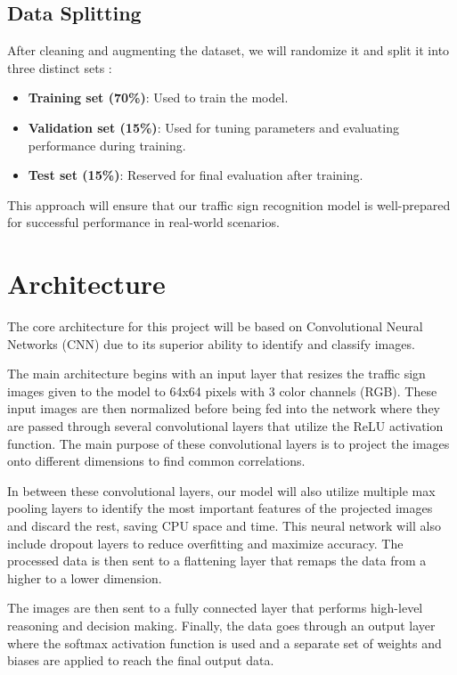 \documentclass{article} %
\begin{document}
\subsection{Data Splitting}
After cleaning and augmenting the dataset, we will randomize it and split it into three distinct sets \citep{baheti2021_train_validation_test_split}:
\begin{itemize}
    \item \textbf{Training set (70\%)}: Used to train the model.
    \item \textbf{Validation set (15\%)}: Used for tuning parameters and evaluating performance during training.
    \item \textbf{Test set (15\%)}: Reserved for final evaluation after training.
\end{itemize}

This approach will ensure that our traffic sign recognition model is well-prepared for successful performance in real-world scenarios.




\section{Architecture}
The core architecture for this project will be based on Convolutional Neural Networks (CNN) due to its superior ability to identify and classify images. 

The main architecture begins with an input layer that resizes the traffic sign images given to the model to 64x64 pixels with 3 color channels (RGB). These input images are then normalized before being fed into the network where they are passed through several convolutional layers that utilize the ReLU activation function. The main purpose of these convolutional layers is to project the images onto different dimensions to find common correlations. 

In between these convolutional layers, our model will also utilize multiple max pooling layers to identify the most important features of the projected images and discard the rest, saving CPU space and time. This neural network will also include dropout layers to reduce overfitting and maximize accuracy. The processed data is then sent to a flattening layer that remaps the data from a higher to a lower dimension. 

The images are then sent to a fully connected layer that performs high-level reasoning and decision making. Finally, the data goes through an output layer where the softmax activation function is used and a separate set of weights and biases are applied to reach the final output data.
\end{document}
